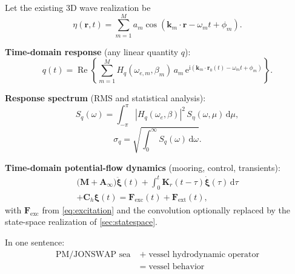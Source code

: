 \documentclass[journal,10pt,twocolumn]{IEEEtran}
\newcommand{\dd}{\,\mathrm{d}}
\newcommand{\ii}{\mathrm{i}}
\newcommand{\ee}{\mathrm{e}}
\newcommand{\Real}{\operatorname{Re}}
\newcommand{\vect}[1]{\bm{#1}}
\begin{document}
    Let the existing 3D wave realization be
    \begin{equation}
        \eta(\vect{r},t)
        = \sum_{m=1}^{M}
        a_m\cos\!\left(\vect{k}_m\cdot\vect{r} - \omega_m t + \phi_m\right).
        \label{eq:summary_eta}
    \end{equation}

    \noindent\textbf{Time-domain response} (any linear quantity $q$):
    \begin{equation}
        q(t)
        = \Real\!\left\{
        \sum_{m=1}^{M}
        H_q(\omega_{e,m},\beta_m)\,a_m\,
        \ee^{\ii(\vect{k}_m\cdot\vect{r}_0(t) - \omega_m t + \phi_m)}
        \right\}.
        \label{eq:summary_td}
    \end{equation}

    \noindent\textbf{Response spectrum} (RMS and statistical analysis):
    \begin{equation}
        S_q(\omega)
        = \int_{-\pi}^{\pi}
        |H_q(\omega_e,\beta)|^2\,S_\eta(\omega,\mu)\dd\mu,
        \label{eq:summary_spec}
    \end{equation}
    \begin{equation}
        \sigma_q = \sqrt{\int_0^\infty S_q(\omega)\dd\omega}.
        \label{eq:summary_rms}
    \end{equation}

    \noindent\textbf{Time-domain potential-flow dynamics}
    (mooring, control, transients):
    \begin{multline}
        \bigl(\vect{M}+\vect{A}_\infty\bigr)\ddot{\vect{\xi}}(t)
        + \int_0^t \vect{K}_r(t-\tau)\dot{\vect{\xi}}(\tau)\dd\tau \\
        + \vect{C}_h\vect{\xi}(t)
        = \vect{F}_{\mathrm{exc}}(t) + \vect{F}_{\mathrm{ext}}(t),
        \label{eq:summary_cummins}
    \end{multline}
    with $\vect{F}_{\mathrm{exc}}$ from \eqref{eq:excitation} and the convolution
    optionally replaced by the state-space realization of \cref{sec:statespace}.

    In one sentence:
	\begin{equation}
	\boxed{
	\begin{aligned}
	\text{PM/JONSWAP sea}
	\;&+\;
	\text{vessel hydrodynamic operator}
	\\
	&=\;
	\text{vessel behavior}
	\end{aligned}
	}
	\label{eq:oneliner}
	\end{equation}

\end{document}
